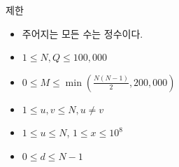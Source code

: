 제한
\begin{itemize}
    \item 주어지는 모든 수는 정수이다.
    \item $1 \le N, Q \le 100,000$
    \item $0 \le M \le \min(\frac{N(N-1)}{2}, 200,000)$
    \item $1 \le u, v \le N, u \neq v$
    \item $1 \le u \le N$, $1 \le x \le 10^8$
    \item $0 \le d \le N-1$
\end{itemize}